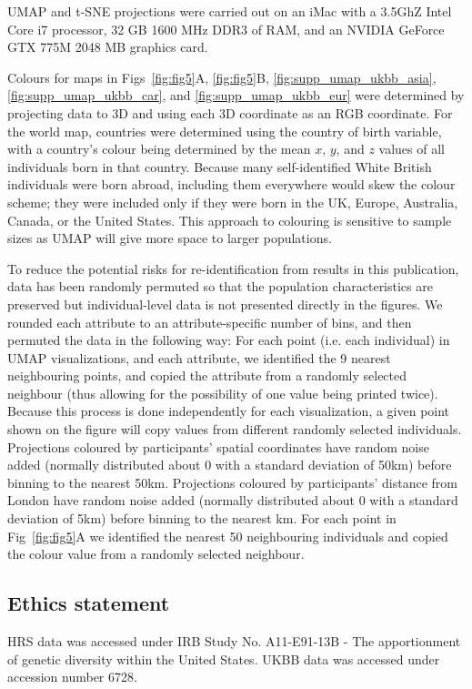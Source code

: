 UMAP and t-SNE projections were carried out on an iMac with a 3.5GhZ Intel Core i7 processor, 32 GB 1600 MHz DDR3 of RAM, and an NVIDIA GeForce GTX 775M 2048 MB graphics card.

Colours for maps in Figs~\ref{fig:fig5}A, \ref{fig:fig5}B, \ref{fig:supp_umap_ukbb_asia}, \ref{fig:supp_umap_ukbb_car}, and \ref{fig:supp_umap_ukbb_eur} were determined by projecting data to 3D and using each 3D coordinate as an RGB coordinate. For the world map, countries were determined using the country of birth variable, with a country's colour being determined by the mean $x$, $y$, and $z$ values of all individuals born in that country. Because many self-identified White British individuals were born abroad, including them everywhere would skew the colour scheme; they were included only if they were born in the UK, Europe, Australia, Canada, or the United States. This approach to colouring is sensitive to sample sizes as UMAP will give more space to larger populations. 

To reduce the potential risks for re-identification from results in this publication, data has been randomly permuted so that the population characteristics are preserved but individual-level data is not presented directly in the figures. We rounded each attribute to an attribute-specific number of bins, and then permuted the data in the following way: 
For each point (i.e. each individual) in UMAP visualizations, and each attribute, we identified the 9 nearest neighbouring points, and copied the attribute from a randomly selected neighbour (thus allowing for the possibility of one value being printed twice).  Because this process is done independently for each visualization, a given point shown on the figure will copy values from different randomly selected individuals. Projections coloured by participants' spatial coordinates have random noise added (normally distributed about 0 with a standard deviation of 50km) before binning to the nearest 50km. Projections coloured by participants' distance from London have random noise added (normally distributed about 0 with a standard deviation of 5km) before binning to the nearest km. For each point in Fig~\ref{fig:fig5}A we identified the nearest 50 neighbouring individuals and copied the colour value from a randomly selected neighbour.

\subsection{Ethics statement}
HRS data was accessed under IRB Study No. A11-E91-13B - The apportionment of genetic diversity within the United States. UKBB data was accessed under accession number 6728.

